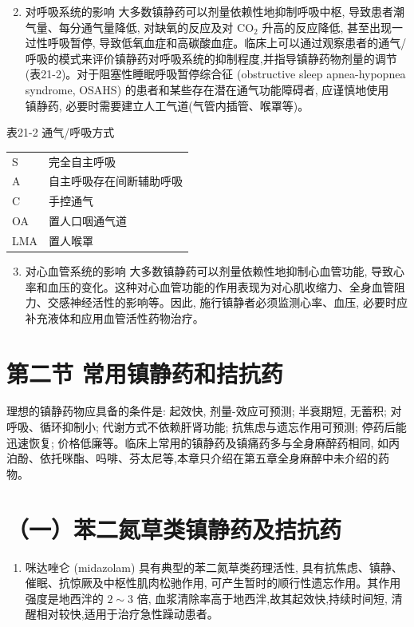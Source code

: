 \documentclass[10pt]{article}
\begin{document}
\begin{enumerate}
  \setcounter{enumi}{1}
  \item 对呼吸系统的影响 大多数镇静药可以剂量依赖性地抑制呼吸中枢, 导致患者潮气量、每分通气量降低, 对缺氧的反应及对 $\mathrm{CO}_{2}$ 升高的反应降低, 甚至出现一过性呼吸暂停, 导致低氧血症和高碳酸血症。临床上可以通过观察患者的通气/呼吸的模式来评价镇静药对呼吸系统的抑制程度,并指导镇静药物剂量的调节(表21-2)。对于阻塞性睡眠呼吸暂停综合征 (obstructive sleep apnea-hypopnea syndrome, OSAHS) 的患者和某些存在潜在通气功能障碍者, 应谨慎地使用\\
镇静药, 必要时需要建立人工气道(气管内插管、喉罩等)。
\end{enumerate}

表21-2 通气/呼吸方式

\begin{center}
\begin{tabular}{ll}
\hline
S & 完全自主呼吸 \\
A & 自主呼吸存在间断辅助呼吸 \\
C & 手控通气 \\
OA & 置人口咽通气道 \\
LMA & 置人喉罩 \\
\hline
\end{tabular}
\end{center}

\begin{enumerate}
  \setcounter{enumi}{2}
  \item 对心血管系统的影响 大多数镇静药可以剂量依赖性地抑制心血管功能, 导致心率和血压的变化。这种对心血管功能的作用表现为对心肌收缩力、全身血管阻力、交感神经活性的影响等。因此, 施行镇静者必须监测心率、血压, 必要时应补充液体和应用血管活性药物治疗。
\end{enumerate}

\section*{第二节 常用镇静药和拮抗药}
理想的镇静药物应具备的条件是: 起效快, 剂量-效应可预测; 半衰期短, 无蓄积; 对呼吸、循环抑制小; 代谢方式不依赖肝肾功能; 抗焦虑与遗忘作用可预测; 停药后能迅速恢复; 价格低廉等。临床上常用的镇静药及镇痛药多与全身麻醉药相同, 如丙泊酚、依托咪酯、吗啡、芬太尼等,本章只介绍在第五章全身麻醉中未介绍的药物。

\section*{（一）苯二氮草类镇静药及拮抗药}
\begin{enumerate}
  \item 咪达唑仑 (midazolam) 具有典型的苯二氮草类药理活性, 具有抗焦虑、镇静、催眠、抗惊厥及中枢性肌肉松驰作用, 可产生暂时的顺行性遗忘作用。其作用强度是地西泮的 $2 \sim 3$ 倍, 血浆清除率高于地西泮,故其起效快,持续时间短, 清醒相对较快,适用于治疗急性躁动患者。
\end{enumerate}
\end{document}
